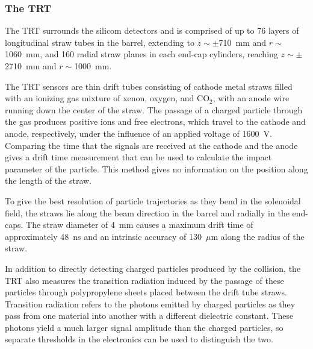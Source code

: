   
\subsubsection{The TRT}

The TRT surrounds the silicom detectors and is comprised of up to 76 layers of longitudinal straw tubes in the barrel, extending to $z\sim \pm$710~mm and $r \sim$1060~mm, and 160 radial straw planes in each end-cap cylinders, reaching $z\sim \pm$2710~mm and $r \sim$1000~mm.

 The TRT sensors are thin drift tubes consisting of cathode metal straws filled with an ionizing gas mixture of xenon, oxygen, and CO$_2$, with an anode wire running down the center of the straw. The passage of a charged particle through the gas produces positive ions and free electrons, which travel to the cathode and anode, respectively, under the influence of an applied voltage of 1600~V. Comparing the time that the signals are received at the cathode and the anode gives a drift time measurement that can be used to calculate the impact parameter of the particle. This method gives no information on the position along the length of the straw.

To give the best resolution of particle trajectories as they bend in the solenoidal field, the straws lie along the beam direction in the barrel and radially in the end-caps. The straw diameter of 4~mm causes a maximum drift time of approximately 48~ns and an intrinsic accuracy of 130~$\mu$m along the radius of the straw.

In addition to directly detecting charged particles produced by the collision, the TRT also measures the transition radiation induced by the passage of these particles through polypropylene sheets placed between the drift tube straws. Transition radiation refers to the photons emitted by charged particles as they pass from one material into another with a different dielectric constant. These photons yield a much larger signal amplitude than the charged particles, so separate thresholds in the electronics can be used to distinguish the two.

 

